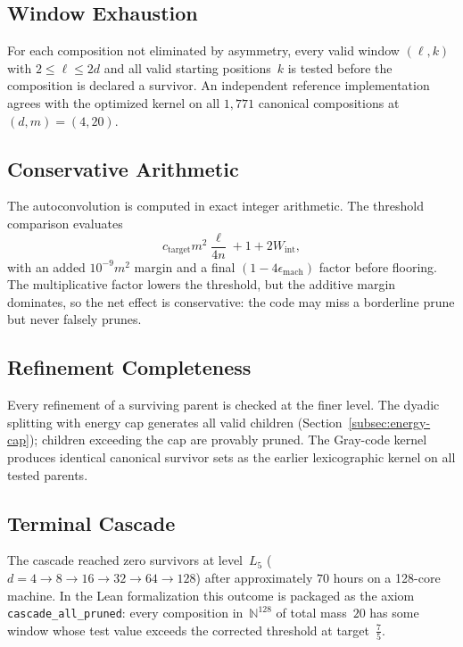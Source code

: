 \documentclass[11pt, letterpaper]{article}
\theoremstyle{paperplain}
\theoremstyle{paperdef}
\newcommand{\N}{\mathbb{N}}
\begin{document}
\subsection{Window Exhaustion}

For each composition not eliminated by asymmetry, every valid
window $(\ell, k)$ with $2 \le \ell \le 2d$ and all valid starting
positions~$k$ is tested before the composition is declared a survivor.
An independent reference implementation agrees with the
optimized kernel on all $1{,}771$ canonical compositions at $(d,m)=(4,20)$.

\subsection{Conservative Arithmetic}

The autoconvolution is computed in exact integer arithmetic.  The
threshold comparison evaluates
\[
  c_{\text{target}}m^2\frac{\ell}{4n} + 1 + 2W_{\text{int}},
\]
with an added $10^{-9}m^2$ margin and a final
$(1 - 4\epsilon_{\text{mach}})$ factor before flooring.  The
multiplicative factor lowers the threshold, but the additive margin
dominates, so the net effect is conservative: the code may miss a
borderline prune but never falsely prunes.

\subsection{Refinement Completeness}

Every refinement of a surviving parent is checked at the finer level.
The dyadic splitting with energy cap generates all valid children
(Section~\ref{subsec:energy-cap}); children exceeding the cap are
provably pruned.  The Gray-code kernel produces identical canonical
survivor sets as the earlier lexicographic kernel on all tested parents.

\subsection{Terminal Cascade}

The cascade reached zero survivors at level~$L_5$
($d=4 \to 8 \to 16 \to 32 \to 64 \to 128$) after approximately
$70$ hours on a 128-core machine.  In the Lean formalization this
outcome is packaged as the axiom \texttt{cascade\_all\_pruned}: every
composition in~$\N^{128}$ of total mass~$20$ has some window whose test
value exceeds the corrected threshold at target~$\tfrac75$.
\end{document}
